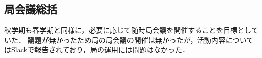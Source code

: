 \subsection*{局会議総括}


秋学期も春学期と同様に，必要に応じて随時局会議を開催することを目標としていた．
議題が無かったため局の局会議の開催は無かったが，活動内容についてはSlackで報告されており，局の運用には問題はなかった．
